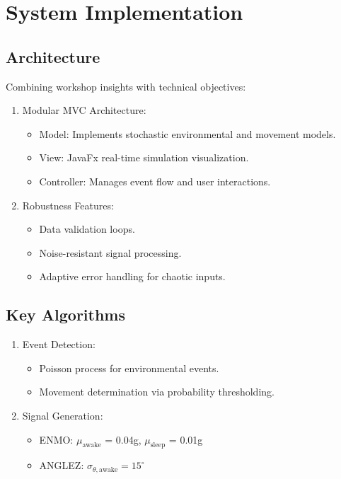 \documentclass[conference]{IEEEtran}
\begin{document}
\section{System Implementation}
\subsection{Architecture}
Combining workshop insights with technical objectives:
\begin{enumerate}
    \item Modular MVC Architecture: 
    \begin{itemize}
        \item Model: Implements stochastic environmental and movement models.
        \item View: JavaFx real-time simulation visualization.
        \item Controller: Manages event flow and user interactions.
    \end{itemize}
    \item Robustness Features: 
    \begin{itemize}
        \item Data validation loops.
        \item Noise-resistant signal processing.
        \item Adaptive error handling for chaotic inputs.
    \end{itemize}
\end{enumerate}

\subsection{Key Algorithms}
\begin{enumerate}
    \item Event Detection: 
        \begin{itemize}
        \item Poisson process for environmental events.
        \item Movement determination via probability thresholding.
        \end{itemize}
    \item Signal Generation:
        \begin{itemize}
        \item ENMO: \(\mu_{\text{awake}}\) = 0.04g, \(\mu_{\text{sleep}}\) = 0.01g
        \item ANGLEZ: \(\sigma_{\theta,\text{awake}} = 15^\circ\)
        \end{itemize}
\end{enumerate}
\end{document}
